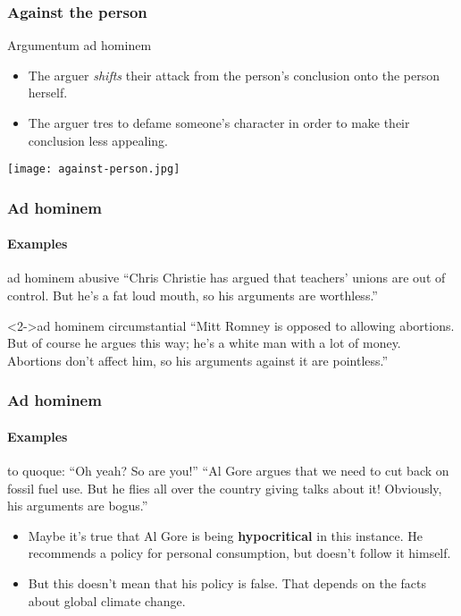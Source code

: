 \documentclass[10pt,letterpaper,xcolor=dvipsnames]{beamer}
\begin{document}
\begin{frame}
  \frametitle{Against the person}
  
  \begin{block}{Argumentum ad hominem}
    \begin{itemize}
      \item The arguer \textit{shifts} their attack from the person's conclusion onto the person herself.
      \item The arguer tres to defame someone's character in order to make their conclusion less appealing.
    \end{itemize}
  \end{block}
  
  \begin{center}
    \texttt{[image: against-person.jpg]}
  \end{center}
  
\end{frame}

\begin{frame}
  \frametitle{Ad hominem}
  \framesubtitle{Examples}
  
  \begin{block}{ad hominem abusive}
    ``Chris Christie has argued that teachers' unions are out of control.  But he's a fat loud mouth, so his arguments are worthless.''
  \end{block}
  
  \begin{block}<2->{ad hominem circumstantial}
    ``Mitt Romney is opposed to allowing abortions.  But of course he argues this way; he's a white man with a lot of money.  Abortions don't affect him, so his arguments against it are pointless.'' 
  \end{block}    

\end{frame}

\begin{frame}
  \frametitle{Ad hominem}
  \framesubtitle{Examples}
  
  \begin{block}{to quoque: ``Oh yeah? So are you!''}
    ``Al Gore argues that we need to cut back on fossil fuel use.  But he flies all over the country giving talks about it!  Obviously, his arguments are bogus.''
  \end{block}
  
  \begin{itemize}
    \item<2-> Maybe it's true that Al Gore is being \textbf{hypocritical} in this instance.  He recommends a policy for personal consumption, but doesn't follow it himself.
    \item<2-> But this doesn't mean that his policy is false.  That depends on the facts about global climate change.
  \end{itemize}
  
\end{frame}
\end{document}

